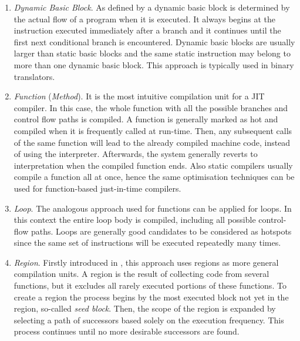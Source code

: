 \begin{enumerate}
  
    \item \textit{Dynamic Basic Block}. As defined by \citeauthor{smith2005virtual} \cite{smith2005virtual} a dynamic basic block is determined by the actual flow of a program when it is executed. It always begins at the instruction executed immediately after a branch and it continues until the first next conditional branch is encountered. Dynamic basic blocks are usually larger than static basic blocks and the same static instruction may belong to more than one dynamic basic block. This approach is typically used in binary translators.
  
    \item \textit{Function} (\textit{Method}). It is the most intuitive compilation unit for a JIT compiler. In this case, the whole function with all the possible branches and control flow paths is compiled. A function is generally marked as hot and compiled when it is frequently called at run-time. Then, any subsequent calls of the same function will lead to the already compiled machine code, instead of using the interpreter. Afterwards, the system generally reverts to interpretation when the compiled function ends. Also static compilers usually compile a function all at once, hence the same optimisation techniques can be used for function-based just-in-time compilers.
   
    \item \textit{Loop}. The analogous approach used for functions can be applied for loops. In this context the entire loop body is compiled, including all possible control-flow paths. Loops are generally good candidates to be considered as hotspots since the same set of instructions will be executed repeatedly many times. 
    
    \item \textit{Region}. Firstly introduced in \cite{hank1995region}, this approach uses regions as more general compilation units. A region is the result of collecting code from several functions, but it excludes all rarely executed portions of these functions. To create a region the process begins by the most executed block not yet in the region, so-called \textit{seed block}. Then, the scope of the region is expanded by selecting a path of successors based solely on the execution frequency. This process continues until no more desirable successors are found.
    

\end{enumerate}
